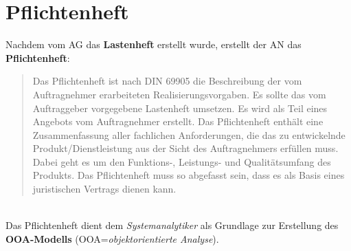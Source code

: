 \section{Pflichtenheft}

\begin{tcolorbox}[title=Pflichenheft]
    Nachdem vom AG das \textbf{Lastenheft} erstellt wurde, erstellt der AN das \textbf{Pflichtenheft}:
    \blockquote[{\cite[306]{AABG14m}}]{
        Das Pflichtenheft ist nach DIN 69905 die Beschreibung der vom Auftragnehmer erarbeiteten Realisierungsvorgaben. Es sollte das vom Auftraggeber vorgegebene
        Lastenheft umsetzen. Es wird als Teil eines Angebots vom Auftragnehmer erstellt.
        Das Pflichtenheft enthält eine Zusammenfassung aller fachlichen Anforderungen,
        die das zu entwickelnde Produkt/Dienstleistung aus der Sicht des Auftragnehmers
        erfüllen muss. Dabei geht es um den Funktions-, Leistungs- und Qualitätsumfang
        des Produkts. Das Pflichtenheft muss so abgefasst sein, dass es als Basis eines juristischen Vertrags dienen kann.
    }\\

    \noindent
    Das Pflichtenheft dient dem \textit{Systemanalytiker} als Grundlage zur Erstellung des \textbf{OOA-Modells} (OOA=\textit{objektorientierte Analyse}).
\end{tcolorbox}
